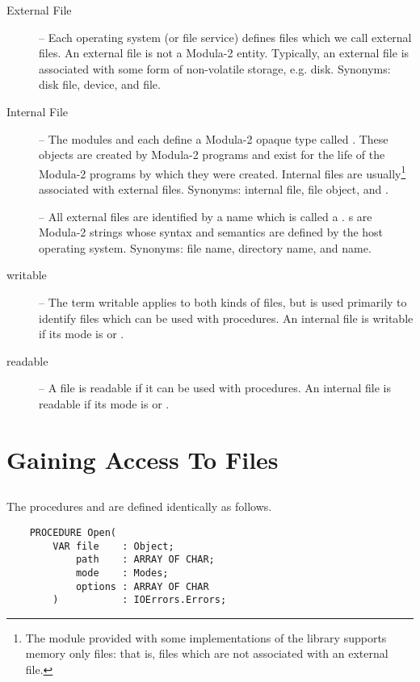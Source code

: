 \begin{description}
\item[External File]
                      --
    Each operating system (or file service) defines files which
    we call external files.  An external file is not a Modula-2
    entity.  Typically, an external file is associated with some
    form of non-volatile storage, e.g. disk.
    Synonyms: disk file, device, and file.
    
\item[Internal File]  --
    The modules  and  each define a
    Modula-2 opaque type called .  These objects are
    created by Modula-2 programs and exist for the life of the Modula-2
    programs by which they were created.  Internal files are usually\footnote{
        The module  provided with some implementations
        of the library supports memory only files: that is, files which
        are not associated with an external file.}
    associated with external files.
    Synonyms: internal file, file object, and .

\item[] --
    All external files are identified by a name which is called a
    .  s are Modula-2 strings whose syntax
    and semantics are defined by the host operating system.
    Synonyms: file name, directory name, and name.
    
\item[writable] -- 
    The term writable applies to both kinds of files, but is used
    primarily to identify files which can be used with
     procedures.  An internal file is writable if its
    mode is  or .

\item[readable] -- 
    A file is readable if it can be used with  procedures.
    An internal file is readable if its
    mode is  or .
\end{description}


\section{Gaining Access To Files} 
\subsection{}
The procedures  and 
are defined identically as follows.
\begin{verbatim}
    PROCEDURE Open(
        VAR file    : Object;
            path    : ARRAY OF CHAR;
            mode    : Modes;
            options : ARRAY OF CHAR
        )           : IOErrors.Errors;
\end{verbatim}

